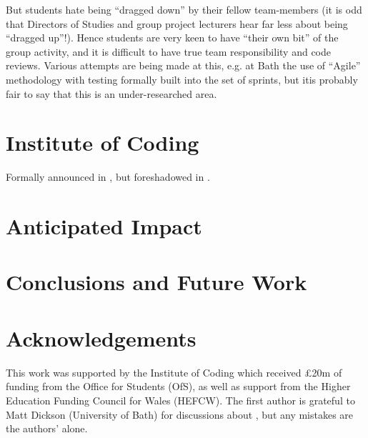 \documentclass[sigconf]{acmart}
\begin{document}
But students hate being ``dragged down'' by their fellow team-members (it is odd that Directors of Studies and group project lecturers hear far less about being ``dragged up''!).  Hence students are very keen to have ``their own bit'' of the group activity, and it is difficult to have true team responsibility and code reviews.  Various attempts are being made at this, e.g. at Bath the use of ``Agile'' methodology with testing formally built into the  set of sprints, but itis probably fair to say that this is an under-researched area.

\section{Institute of Coding}

Formally announced in \cite{DfE2018a}, but foreshadowed in
\cite{HMG2015a}.



\section{Anticipated Impact}

\section{Conclusions and Future Work}


\section{Acknowledgements}

This work was supported by the Institute of Coding which received
\pounds20m of funding from the Office for Students (OfS), as well as
support from the Higher Education Funding Council for Wales (HEFCW).
The first author is grateful to Matt Dickson (University of Bath) for
discussions about \cite{DfE2018d}, but any mistakes are the authors'
alone.



 
\end{document}
